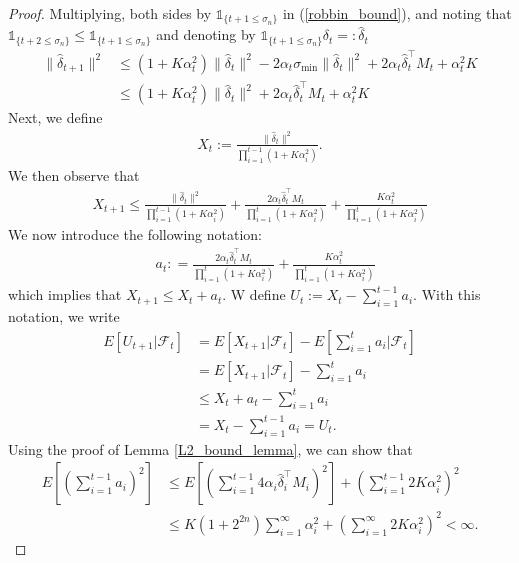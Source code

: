 \documentclass[11pt]{article}
\begin{document}
\begin{proof}
Multiplying, both sides by $\mathds{1}_{\{t+1\leq \sigma_n\}}$ in (\ref{robbin_bound}), and noting that $\mathds{1}_{\{t+2\leq \sigma_n\}} \leq \mathds{1}_{\{t+1\leq \sigma_n\}}$ and denoting by $\mathds{1}_{\{t+1\leq \sigma_n\}}\delta_t=:\hat{\delta}_t$
\begin{align}\label{stopped_ineq}
\|\hat{\delta}_{t+1}\|^2 &\leq(1+K\alpha_t^2)\|\hat{\delta}_t\|^2 - 2\alpha_t \sigma_{\min}\|\hat{\delta}_t\|^2 + 2\alpha_t \hat{\delta}^\intercal_t M_t + \alpha_t^2 K\nonumber\\
&\leq (1+K\alpha_t^2)\|\hat{\delta}_t\|^2 + 2\alpha_t \hat{\delta}^\intercal_t M_t + \alpha_t^2 K
\end{align}
Next, we define 
\begin{align*}
X_t:=\frac{\|\hat{\delta}_t\|^2}{\prod_{i=1}^{t-1}(1+K\alpha_i^2)}.
\end{align*}
We then observe that 
\begin{align*}
X_{t+1}\leq \frac{\|\hat{\delta}_t\|^2}{\prod_{i=1}^{t-1}(1+K\alpha_i^2)}+ \frac{2\alpha_t \hat{\delta}^\intercal_t M_t }{\prod_{i=1}^{t}(1+K\alpha_i^2)} + \frac{K \alpha_t^2}{\prod_{i=1}^{t}(1+K\alpha_i^2)}
\end{align*}
We now introduce the following notation:
\begin{align*}
&a_t: = \frac{2\alpha_t \hat{\delta}^\intercal_t M_t }{\prod_{i=1}^{t}(1+K\alpha_i^2)} +  \frac{K \alpha_t^2}{\prod_{i=1}^{t}(1+K\alpha_i^2)}
\end{align*}
which implies that 
$
X_{t+1}\leq X_t + a_t .
$
W define 
$
U_t:= X_t - \sum_{i=1}^{t-1}a_i.
$
With this notation, we write
\begin{align}\label{sup_mart}
E[U_{t+1}|\mathcal{F}_t] &= E[X_{t+1}|\mathcal{F}_t] - E[\sum_{i=1}^{t}a_i|\mathcal{F}_t] \nonumber\\
& =  E[X_{t+1}|\mathcal{F}_t] - \sum_{i=1}^{t}a_i\nonumber\\
& \leq  X_t + a_t  - \sum_{i=1}^{t}a_i\nonumber\\
& = X_t  - \sum_{i=1}^{t-1}a_i= U_t.
\end{align}
Using the proof of Lemma \ref{L2_bound_lemma}, we can show that 
\begin{align*}
E[(\sum_{i=1}^{t-1}a_i)^2] &\leq E\left[ (\sum_{i=1 }^{t-1}4\alpha_i \hat{\delta}^\intercal_i M_i)^2   \right] + \left(\sum_{i=1 }^{t-1}2 K\alpha_i^2\right)^2\\
&\leq K (1+2^{2n}) \sum_{i=1}^{\infty} \alpha_i^2 + \left(\sum_{i=1 }^{\infty}2 K\alpha_i^2\right)^2 < \infty.
\end{align*}

\end{proof}
\end{document}
